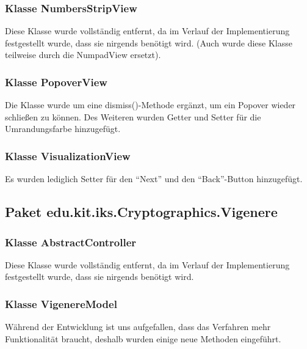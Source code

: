 \documentclass{article}
\begin{document}
	\subsubsection{Klasse NumbersStripView}

	Diese Klasse wurde vollständig entfernt, da im Verlauf der Implementierung festgestellt wurde,
	dass sie nirgends benötigt wird. (Auch wurde diese Klasse teilweise durch die NumpadView ersetzt).

	\subsubsection{Klasse PopoverView}

	Die Klasse wurde um eine dismiss()-Methode ergänzt, um ein Popover wieder schließen zu können.
	Des Weiteren wurden Getter und Setter für die Umrandungsfarbe hinzugefügt.

	\subsubsection{Klasse VisualizationView}

	Es wurden lediglich Setter für den ``Next'' und den ``Back''-Button hinzugefügt.

  \subsection{Paket edu.kit.iks.Cryptographics.Vigenere}
    \subsubsection{Klasse AbstractController}
	Diese Klasse wurde vollständig entfernt, da im Verlauf der Implementierung festgestellt wurde,
	dass sie nirgends benötigt wird.
	
    \subsubsection{Klasse VigenereModel}
	Während der Entwicklung ist uns aufgefallen, dass das Verfahren mehr Funktionalität braucht, deshalb wurden einige neue Methoden eingeführt.\newline
           
\end{document}
